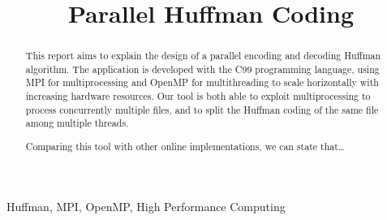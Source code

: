 \documentclass[conference]{IEEEtran}
\begin{document}
\title{Parallel Huffman Coding}

\author{
    \and
}

\maketitle

\thispagestyle{plain}
\pagestyle{plain}

\begin{abstract}
    This report aims to explain the design of a parallel encoding and decoding Huffman algorithm. The application is developed with the C99 programming language, using MPI for multiprocessing and OpenMP for multithreading to scale horizontally with increasing hardware resources. Our tool is both able to exploit multiprocessing to process concurrently multiple files, and to split the Huffman coding of the same file among multiple threads.

    Comparing this tool with other online implementations, we can state that\dots
\end{abstract}

\begin{IEEEkeywords}
    Huffman, MPI, OpenMP, High Performance Computing
\end{IEEEkeywords}







{}


\end{document}
